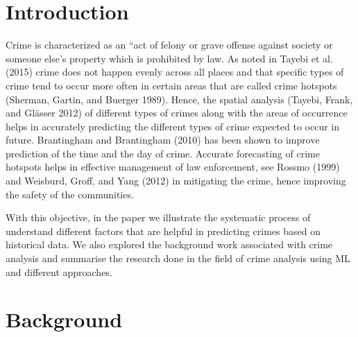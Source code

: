 \documentclass[conference,final,]{IEEEtran}
\begin{document}
\maketitle


%
\IEEEpeerreviewmaketitle


\section{Introduction}\label{introduction}

Crime is characterized as an ``act of felony or grave offense against
society or someone else's property which is prohibited by law. As noted
in Tayebi et al. (2015) crime does not happen evenly across all places
and that specific types of crime tend to occur more often in certain
areas that are called crime hotspots (Sherman, Gartin, and Buerger
1989). Hence, the spatial analysis (Tayebi, Frank, and Glässer 2012) of
different types of crimes along with the areas of occurrence helps in
accurately predicting the different types of crime expected to occur in
future. Brantingham and Brantingham (2010) has been shown to improve
prediction of the time and the day of crime. Accurate forecasting of
crime hotspots helps in effective management of law enforcement, see
Rossmo (1999) and Weisburd, Groff, and Yang (2012) in mitigating the
crime, hence improving the safety of the communities.

With this objective, in the paper we illustrate the systematic process
of understand different factors that are helpful in predicting crimes
based on historical data. We also explored the background work associated
with crime analysis and summarise the research done in the field of
crime analysis using ML and different approaches.

\section{Background}\label{background}
\end{document}
